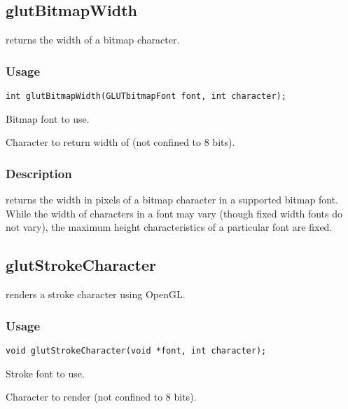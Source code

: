 \subsection{glutBitmapWidth}

 returns the width of a bitmap character.

\subsubsection*{Usage}
\begin{verbatim}
int glutBitmapWidth(GLUTbitmapFont font, int character);
\end{verbatim}
\begin{description}
\itemsep 0in
\item[{\tt font}]
Bitmap font to use.
\item[{\tt character}]
Character to return width of (not confined to 8 bits).
\end{description}

\subsubsection*{Description}

 returns the width in pixels of a bitmap character
in a supported bitmap font.  While the width of characters in a font
may vary (though fixed width fonts do not vary), the maximum height
characteristics of a particular font are fixed.

\subsection{glutStrokeCharacter}

 renders a stroke character using OpenGL.

\subsubsection*{Usage}
\begin{verbatim}
void glutStrokeCharacter(void *font, int character);
\end{verbatim}
\begin{description}
\itemsep 0in
\item[{\tt font}]
Stroke font to use.
\item[{\tt character}]
Character to render (not confined to 8 bits).
\end{description}

